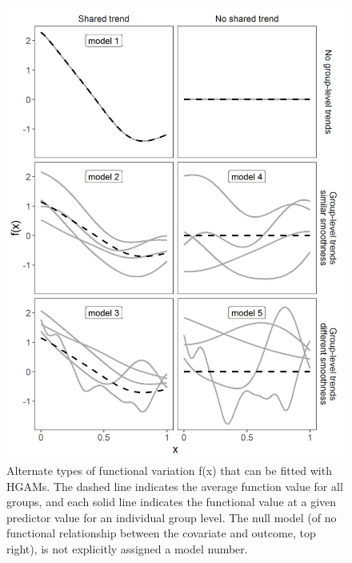 \documentclass[12pt]{article}
\begin{document}
\begin{figure}
\centering
\includegraphics{../figures/alternate_models.png}
\caption{\label{fig:models}Alternate types of functional variation f(x)
that can be fitted with HGAMs. The dashed line indicates the average
function value for all groups, and each solid line indicates the
functional value at a given predictor value for an individual group
level. The null model (of no functional relationship between the
covariate and outcome, top right), is not explicitly assigned a model
number.}
\end{figure}
\end{document}
